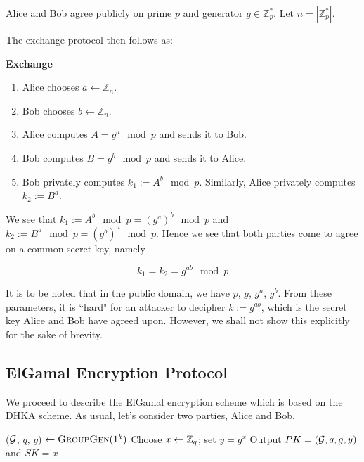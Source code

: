 Alice and Bob agree publicly on prime \( p \) and generator \( g \in \mathbb{Z}^*_p \). 
Let \( n = |\mathbb{Z}^*_p| \).

The exchange protocol then follows as:

\begin{tcolorbox}
\textbf{Exchange} 
\begin{enumerate}
    \item Alice chooses \( a \leftarrow \mathbb{Z}_n \). 
    \item Bob chooses \( b \leftarrow \mathbb{Z}_n \).
    \item Alice computes \( A = g^a \mod p \) and sends it to Bob.
    \item Bob computes \( B = g^b \mod p \) and sends it to Alice.
    \item Bob privately computes \( k_1 := A^b \mod p \). Similarly, Alice privately computes \( k_2 := B^a \).
\end{enumerate}
\end{tcolorbox}

We see that \( k_1 := A^b \mod p = (g^a)^b \mod p \) and \( k_2 := B^a \mod p = (g^b)^a \mod p \). Hence we see that both parties come to agree on a common secret key, namely

\begin{equation}
    k_1 = k_2 = g^{ab} \mod p
\end{equation}

It is to be noted that in the public domain, we have \( p \), \( g \), \( g^a \), \( g^b \). 
From these parameters, it is ``hard" for an attacker to decipher \( k := g^{ab} \), which is the secret key Alice and Bob have agreed upon. 
However, we shall not show this explicitly for the sake of brevity.

\subsection{ElGamal Encryption Protocol}

We proceed to describe the ElGamal encryption scheme which is based on the DHKA scheme. As usual, let's consider two parties, Alice and Bob.



\smallskip


\begin{algorithmic}
\STATE ($ \mathcal{G} $, $ q $, $ g $) $ \leftarrow \textsc{GroupGen} (1^k) $ 
\STATE Choose $ x \leftarrow \mathbb{Z}_q $; set $ y = g^x $ 
\STATE Output $ PK = ( \mathcal{G}, q, g, y) $ and $ SK = x $ 
\end{algorithmic} 

